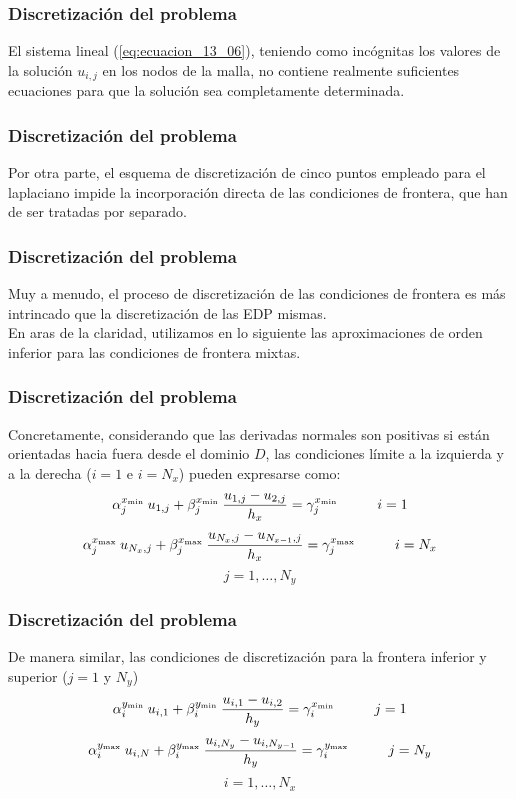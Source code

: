 \documentclass[12pt]{beamer}
\begin{document}
\begin{frame}
\frametitle{Discretización del problema}
El sistema lineal (\ref{eq:ecuacion_13_06}), teniendo como incógnitas los valores de la solución $u_{i, j}$ en los nodos de la malla, no contiene realmente suficientes ecuaciones para que la solución sea completamente determinada. 
\end{frame}
\begin{frame}
\frametitle{Discretización del problema}
Por otra parte, el esquema de discretización de cinco puntos empleado para el laplaciano impide la incorporación directa de las condiciones de frontera, que han de ser tratadas por separado.
\end{frame}
\begin{frame}
\frametitle{Discretización del problema}
Muy a menudo, el proceso de discretización de las condiciones de frontera es más intrincado que la discretización de las EDP mismas.
\\
\bigskip
En aras de la claridad, utilizamos en lo siguiente las aproximaciones de orden inferior para las condiciones de frontera mixtas.
\end{frame}
\begin{frame}
\frametitle{Discretización del problema}
Concretamente, considerando que las derivadas normales son positivas si están orientadas hacia fuera desde el dominio $D$, las condiciones límite a la izquierda y a la derecha ($i = 1$ e $i = N_{x}$) pueden expresarse como:
\[ \alpha_{j}^{x_{\text{\tiny{min}}}} \: u_{1, j} + \beta_{j}^{x_{\text{\tiny{min}}}} \: \dfrac{u_{1, j} - u_{2, j}}{h_{x}} = \gamma_{j}^{x_{\text{\tiny{min}}}} \hspace{1cm} i = 1  \]
\[ \alpha_{j}^{x_{\mbox{\tiny{max}}}} \: u_{N_{x}, j} + \beta_{j}^{x_{\text{\tiny{max}}}} \: \dfrac{u_{N_{x}, j} - u_{N_{x-1}, j}}{h_{x}} = \gamma_{j}^{x_{\text{\tiny{max}}}} \hspace{1cm} i = N_{x} \]
\[ j = 1, \ldots, N_{y}  \]
\end{frame}
\begin{frame}
\frametitle{Discretización del problema}
De manera similar, las condiciones de discretización para la frontera inferior y superior ($j = 1$ y $N_{y}$)
\[ \alpha_{i}^{y_{\text{\tiny{min}}}} \: u_{i, 1} + \beta_{i}^{y_{\text{\tiny{min}}}} \: \dfrac{u_{i, 1} - u_{i, 2}}{h_{y}} = \gamma_{i}^{x_{\text{\tiny{min}}}} \hspace{1cm} j = 1  \]
\[ \alpha_{i}^{y_{\text{\tiny{max}}}} \: u_{i, N} + \beta_{i}^{y_{\text{\tiny{max}}}} \: \dfrac{u_{i, N_{y}} - u_{i, N_{y-1}}}{h_{y}} = \gamma_{i}^{y_{\text{\tiny{max}}}} \hspace{1cm} j = N_{y} \]
\[ i = 1, \ldots, N_{x}  \]
\end{frame}
\end{document}
